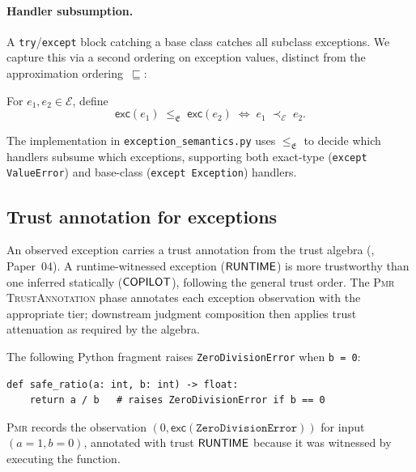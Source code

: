 \documentclass[11pt]{article}
\newcommand{\Apx}{\sqsubseteq}              %
\newcommand{\PExc}[1]{\mathsf{exc}(#1)}    %
\newcommand{\PMR}{\textsc{Pmr}}            %
\newcommand{\PVal}{\mathbf{V}}             %
\newcommand{\ExcH}{\mathcal{E}}            %
\newcommand{\ExcAlg}{\mathfrak{E}}         %
\newcommand{\ExcSub}{\prec_{\!\ExcH}}      %
\begin{document}
\paragraph{Handler subsumption.}
A \texttt{try}/\texttt{except} block catching a base class catches all
subclass exceptions.  We capture this via a second ordering on
exception values, distinct from the approximation ordering~$\Apx$:

\begin{definition}[Exception subsumption in $\PVal_f$]\label{def:exc-sub}
For $e_1, e_2 \in \ExcH$, define
\[
  \PExc{e_1} \;\leq_{\ExcAlg}\; \PExc{e_2}
  \;\Longleftrightarrow\;
  e_1 \;\ExcSub\; e_2.
\]
\end{definition}

The \JuGeo{} implementation in
\texttt{exception\_semantics.py} uses $\leq_{\ExcAlg}$ to decide which
handlers subsume which exceptions, supporting both exact-type
(\lstinline{except ValueError}) and base-class
(\lstinline{except Exception}) handlers.

\subsection{Trust annotation for exceptions}

An observed exception carries a trust annotation from the \JuGeo{}
trust algebra (\cite{jugeo04}, Paper~04).  A runtime-witnessed
exception ($\mathsf{RUNTIME}$) is more trustworthy than one inferred
statically ($\mathsf{COPILOT}$), following the general trust order.  The
\PMR{} \textsc{TrustAnnotation} phase annotates each exception
observation with the appropriate tier; downstream judgment composition
then applies trust attenuation as required by the algebra.

\begin{example}\label{ex:exc}
The following Python fragment raises \texttt{ZeroDivisionError} when
\texttt{b = 0}:
\begin{lstlisting}[caption={Precondition violation producing an exception.},
  label=lst:div]
def safe_ratio(a: int, b: int) -> float:
    return a / b   # raises ZeroDivisionError if b == 0
\end{lstlisting}
\PMR{} records the observation $(0, \PExc{\texttt{ZeroDivisionError}})$
for input $(a{=}1, b{=}0)$, annotated with trust $\mathsf{RUNTIME}$ because it
was witnessed by executing the function.
\end{example}

\end{document}
